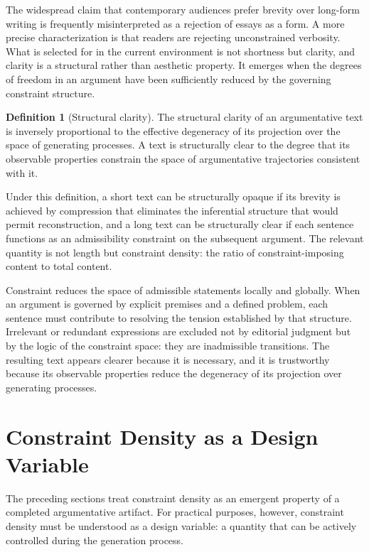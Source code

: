 \documentclass[12pt, oneside]{article}
\theoremstyle{plain}
\theoremstyle{definition}
\newtheorem{definition}[theorem]{Definition}
\theoremstyle{remark}
\begin{document}
The widespread claim that contemporary audiences prefer brevity over long-form writing is
frequently misinterpreted as a rejection of essays as a form. A more precise characterization
is that readers are rejecting unconstrained verbosity. What is selected for in the current
environment is not shortness but clarity, and clarity is a structural rather than aesthetic
property. It emerges when the degrees of freedom in an argument have been sufficiently
reduced by the governing constraint structure.

\begin{definition}[Structural clarity]
The structural clarity of an argumentative text is inversely proportional to the effective
degeneracy of its projection over the space of generating processes. A text is structurally
clear to the degree that its observable properties constrain the space of argumentative
trajectories consistent with it.
\end{definition}

Under this definition, a short text can be structurally opaque if its brevity is achieved
by compression that eliminates the inferential structure that would permit reconstruction,
and a long text can be structurally clear if each sentence functions as an admissibility
constraint on the subsequent argument. The relevant quantity is not length but constraint
density: the ratio of constraint-imposing content to total content.

Constraint reduces the space of admissible statements locally and globally. When an argument
is governed by explicit premises and a defined problem, each sentence must contribute to
resolving the tension established by that structure. Irrelevant or redundant expressions are
excluded not by editorial judgment but by the logic of the constraint space: they are
inadmissible transitions. The resulting text appears clearer because it is necessary, and
it is trustworthy because its observable properties reduce the degeneracy of its projection
over generating processes.

\section{Constraint Density as a Design Variable}

The preceding sections treat constraint density as an emergent property of a
completed argumentative artifact. For practical purposes, however, constraint
density must be understood as a design variable: a quantity that can be actively
controlled during the generation process.
\end{document}
